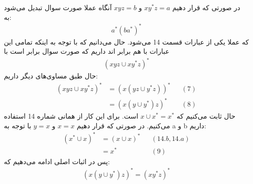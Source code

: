 \subsubsection{}
در صورتی که قرار دهیم
$xy^*z = a$
و
$xyz = b$
آنگاه عملا صورت سوال تبدیل می‌شود به:
\begin{gather*}
    a^*(ba^*)^*
\end{gather*}
که عملا یکی از عبارات قسمت
14
می‌شود. حال می‌دانیم که با توجه به اینکه تمامی این عبارات با هم برابر اند داریم که صورت سوال برابر است با
\begin{gather*}
    (xyz \cup xy^*z)^*
\end{gather*}
حال طبق مساوی‌های دیگر داریم:
\begin{align*}
    (xyz \cup xy^*z)^* &= (x(yz \cup y^*z))^* && (7)\\
    &= (x(y \cup y^*)z)^* && (8)
\end{align*}
حال ثابت می‌کنیم که
$x \cup x^* = x^*$
است. برای این کار از همانی شماره
14
استفاده می‌کنیم.
در صورتی که قرار دهیم
$x = x$ و $y = x$
با توجه به
a و b
داریم:
\begin{align*}
    (x^* \cup x)^* &= (x \cup x)^* && (14.b, 14.a)\\
    &= x^* && (9)
\end{align*}
پس در اثبات اصلی ادامه می‌دهیم که:
\begin{gather*}
    (x(y \cup y^*)z)^* = (xy^*z)^*
\end{gather*}
\subsubsection{}
